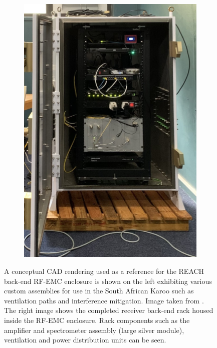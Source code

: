 \begin{figure}[t]
\begin{subfigure}{.4\textwidth}
        \includegraphics[width=\linewidth]{backend}
    \end{subfigure}
    \caption{A conceptual CAD rendering used as a reference for the REACH back-end RF-EMC enclosure is shown on the left exhibiting various custom assemblies for use in the South African Karoo such as ventilation paths and interference mitigation. Image taken from \citet{hera_enclosure}. The right image shows the completed receiver back-end rack housed inside the RF-EMC enclosure. Rack components such as the amplifier and spectrometer assembly (large silver module), ventilation and power distribution units can be seen.}
    \label{fig:backend}
\end{figure}

